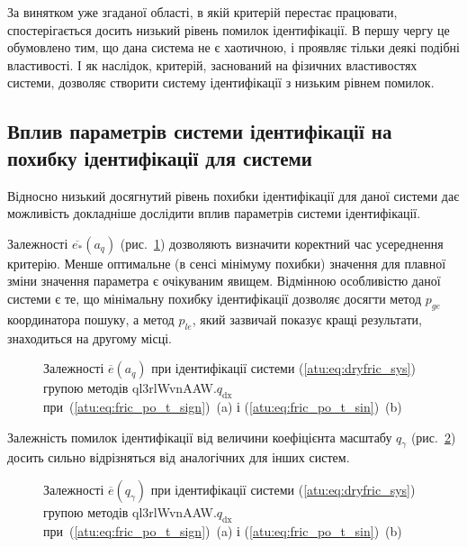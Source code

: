 За винятком уже згаданої області, в якій критерій перестає
працювати, спостерігається досить низький рівень помилок
ідентифікації. В першу чергу це обумовлено тим, що дана система
не є хаотичною, і проявляє тільки деякі подібні властивості. І
як наслідок, критерій, заснований на фізичних властивостях
системи, дозволяє створити систему ідентифікації з низьким
рівнем помилок.






\subsection{Вплив параметрів системи ідентифікації на похибку ідентифікації для системи} %

Відносно низький досягнутий рівень похибки ідентифікації для
даної системи дає можливість докладніше дослідити вплив параметрів
системи ідентифікації.


Залежності
$ \overline{e_*} (a_q) $
(рис.~\ref{atu:f:fric_a_q_ql3rlWvnAAW_q_dx}) дозволяють визначити
коректний час усереднення критерію. Менше оптимальне (в сенсі
мінімуму похибки) значення для плавної зміни значення
параметра є очікуваним явищем. Відмінною особливістю даної
системи є те, що мінімальну похибку ідентифікації дозволяє
досягти метод
$ p_{ge} $ координатора пошуку, а метод
$ p_{le} $, який зазвичай показує кращі результати, знаходиться на
другому місці.


\begin{figure}[htb!]
  \caption{Залежності $ \overline{e} (a_q)$ при ідентифікації системи (\ref{atu:eq:dryfric_sys}) групою методів ql3rlWvnAAW.$q_\mathrm{dx} $ при~(\ref{atu:eq:fric_po_t_sign})~(a) і (\ref{atu:eq:fric_po_t_sin})~(b)}
\label{atu:f:fric_a_q_ql3rlWvnAAW_q_dx}
\end{figure}


Залежність помилок ідентифікації від величини коефіцієнта масштабу
$q_\gamma$
(рис.~\ref{atu:f:fric_q_gamma_ql3rlWvnAAW_q_dx})
досить сильно відрізняться від аналогічних для інших систем.

\begin{figure}[htb!]
  \caption{Залежності $ \overline{e} (q_\gamma) $ при ідентифікації системи (\ref{atu:eq:dryfric_sys}) групою методів ql3rlWvnAAW.$q_\mathrm{dx} $ при~(\ref{atu:eq:fric_po_t_sign})~(a) і (\ref{atu:eq:fric_po_t_sin})~(b)}
\label{atu:f:fric_q_gamma_ql3rlWvnAAW_q_dx}
\end{figure}

